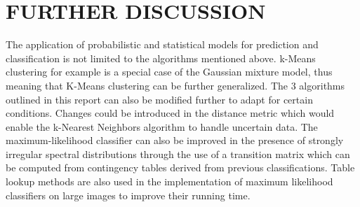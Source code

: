                                                                                                                                   \section{\label{sec:level6}FURTHER DISCUSSION}
                                                                                                                                  The application of probabilistic and statistical models for prediction and classification is not limited to the algorithms mentioned above. k-Means clustering for example is a special case of the Gaussian mixture model, thus meaning that K-Means clustering can be further generalized. The 3 algorithms outlined in this report can also be modified further to adapt for
                                                                                                                                  certain conditions. Changes could be introduced in the distance metric which would enable the k-Nearest Neighbors algorithm to handle uncertain data.\cite{uncertain} The maximum-likelihood classifier can also be improved in the presence of strongly irregular spectral distributions through the use of a transition matrix which can be computed from contingency tables
                                                                                                                                  derived from previous classifications.\cite{mlefar} Table lookup methods are also used in the implementation of maximum likelihood classifiers on large images to improve their running time. \cite{mletime}

